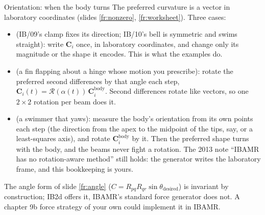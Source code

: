 \documentclass[aspectratio=169,11pt]{beamer}
\begin{document}
\begin{frame}{Orientation: when the body turns}
\label{fr:orientation}
\small The preferred curvature is a vector in laboratory coordinates (slides \ref{fr:nonzero}, \ref{fr:worksheet}). Three cases:
\begin{itemize}
  \item {} (IB/09's clamp fixes its direction; IB/10's bell is symmetric and swims straight): write $\mathbf{C}_i$ once, in laboratory coordinates, and change only its magnitude or the shape it encodes. This is what the examples do.
  \item {} (a fin flapping about a hinge whose motion you prescribe): rotate the preferred second differences by that angle each step, $\mathbf{C}_i(t) = \mathcal{R}(\alpha(t))\,\mathbf{C}_i^{\mathrm{body}}$. Second differences rotate like vectors, so one $2\times2$ rotation per beam does it.
  \item {} (a swimmer that yaws): measure the body's orientation from its own points each step (the direction from the apex to the midpoint of the tips, say, or a least-squares axis), and rotate $\mathbf{C}_i^{\mathrm{body}}$ by it. Then the preferred shape turns with the body, and the beams never fight a rotation. The 2013 note ``IBAMR has no rotation-aware method'' still holds: the generator writes the laboratory frame, and this bookkeeping is yours.
\end{itemize}
\vspace{1mm}
\begin{punchbox}
\footnotesize The angle form of slide \ref{fr:angle} ($C = R_{pq}R_{qr}\sin\theta_{\mathrm{desired}}$) is invariant by construction; IB2d offers it, IBAMR's standard force generator does not. A chapter 9b force strategy of your own could implement it in IBAMR.
\end{punchbox}
\end{frame}
\end{document}

